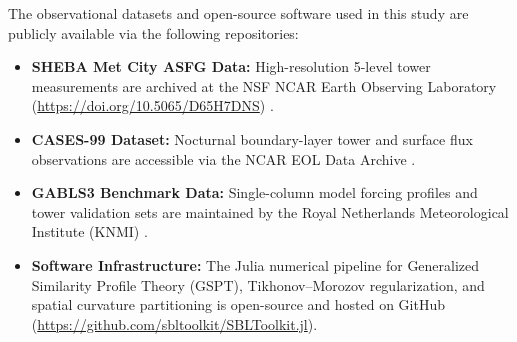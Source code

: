 \documentclass[draft,11pt]{article}
\theoremstyle{definition}
\theoremstyle{remark}
\begin{document}
The observational datasets and open-source software used in this study are publicly available via the following repositories:
\begin{itemize}
    \item \textbf{SHEBA Met City ASFG Data:} High-resolution 5-level tower measurements are archived at the NSF NCAR Earth Observing Laboratory (\url{https://doi.org/10.5065/D65H7DNS}) \cite{andreas2007}.
    \item \textbf{CASES-99 Dataset:} Nocturnal boundary-layer tower and surface flux observations are accessible via the NCAR EOL Data Archive \cite{cases99}.
    \item \textbf{GABLS3 Benchmark Data:} Single-column model forcing profiles and tower validation sets are maintained by the Royal Netherlands Meteorological Institute (KNMI) \cite{gabls3_2013}.
    \item \textbf{Software Infrastructure:} The Julia numerical pipeline for Generalized Similarity Profile Theory (GSPT), Tikhonov--Morozov regularization, and spatial curvature partitioning is open-source and hosted on GitHub (\url{https://github.com/sbltoolkit/SBLToolkit.jl}).
\end{itemize}



\end{document}
